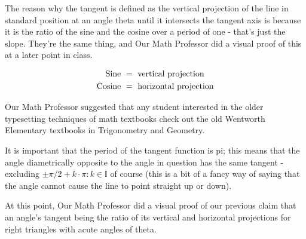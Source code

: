 \documentclass{article}
\begin{document}
The reason why the tangent is defined as the vertical projection of the line in standard position at an angle theta until it intersects the tangent axis is because it is the ratio of the sine and the cosine over a period of one - that's just the slope. They're the same thing, and Our Math Professor did a visual proof of this at a later point in class.

\begin{align*}
\textnormal{Sine }&=\textnormal{ vertical

projection}\\
\textnormal{Cosine }&=\textnormal{ horizontal

projection}
\end{align*}

\vspace{10pt}

Our Math Professor suggested that any student interested in the older typesetting techniques of math textbooks check out the old Wentworth Elementary textbooks in Trigonometry and Geometry.

\vspace{10pt}

It is important that the period of the tangent function is  pi; this means that the angle diametrically opposite to the angle in question has the same tangent - excluding $\pm\pi/2+k\cdot\pi:k\in\mathbb{I}$ of course (this is a bit of a fancy way of saying that the angle cannot cause the line to point straight up or down).

\vspace{10pt}

At this point, Our Math Professor did a visual proof of our previous claim that an angle's tangent being the ratio of  its vertical and horizontal projections for right triangles with acute angles of theta.

\vspace{10pt}

\begin{center}
\end{center}
\end{document}
